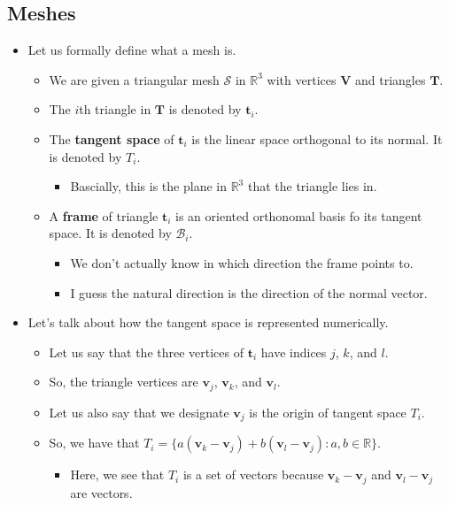 \documentclass[10pt]{article}
\newcommand{\ve}[1]{\mathbf{#1}}
\newcommand{\mcal}[1]{\mathcal{#1}}
\newcommand{\Real}{\mathbb{R}}
\begin{document}
\subsection{Meshes}

\begin{itemize}
    \item Let us formally define what a mesh is.
    \begin{itemize}
        \item We are given a triangular mesh $\mcal{S}$ in $\Real^3$ with vertices $\ve{V}$ and triangles $\ve{T}$.
        \item The $i$th triangle in $\ve{T}$ is denoted by $\ve{t}_i$.
        \item The {\bf tangent space} of $\ve{t}_i$ is the linear space orthogonal to its normal. It is denoted by $T_i$.
        \begin{itemize}
            \item Bascially, this is the plane in $\Real^3$ that the triangle lies in.
        \end{itemize}
        \item A {\bf frame} of triangle $\ve{t}_i$ is an oriented orthonomal basis fo its tangent space. It is denoted by $\mcal{B}_i$.
        \begin{itemize}
            \item We don't actually know in which direction the frame points to.
            \item I guess the natural direction is the direction of the normal vector.            
        \end{itemize}
    \end{itemize}

    \item Let's talk about how the tangent space is represented numerically.
    \begin{itemize}
        \item Let us say that the three vertices of $\ve{t}_i$ have indices $j$, $k$, and $l$.
        
        \item So, the triangle vertices are $\ve{v}_j$, $\ve{v}_k$, and $\ve{v}_l$.
        
        \item Let us also say that we designate $\ve{v}_j$ is the origin of tangent space $T_i$.
        
        \item So, we have that $T_i = \{ a(\ve{v}_k - \ve{v}_j) + b(\ve{v}_l - \ve{v}_j) : a, b \in \Real \}$.
        \begin{itemize}
            \item Here, we see that $T_i$ is a set of vectors because $\ve{v}_k - \ve{v}_j$ and $\ve{v}_l - \ve{v}_j$ are vectors.            
        \end{itemize}
        

\end{itemize}
\end{itemize}
\end{document}
